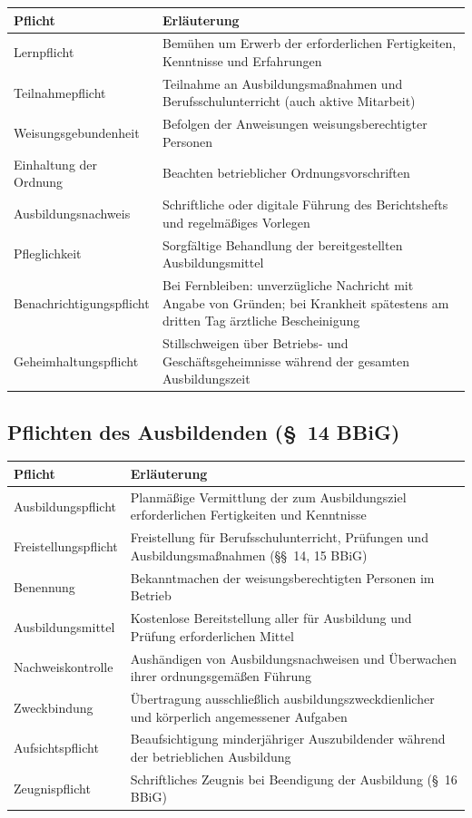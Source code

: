 \documentclass[11pt, a4paper]{article}
\begin{document}
\begin{center}
\begin{tabular}{p{4cm} p{9cm}}
\toprule
\textbf{Pflicht} & \textbf{Erläuterung}\\
\midrule
Lernpflicht & Bemühen um Erwerb der erforderlichen Fertigkeiten, Kenntnisse und Erfahrungen\\
Teilnahmepflicht & Teilnahme an Ausbildungsmaßnahmen und Berufsschulunterricht (auch aktive Mitarbeit)\\
Weisungsgebundenheit & Befolgen der Anweisungen weisungsberechtigter Personen\\
Einhaltung der Ordnung & Beachten betrieblicher Ordnungsvorschriften\\
Ausbildungsnachweis & Schriftliche oder digitale Führung des Berichtshefts und regelmäßiges Vorlegen\\
Pfleglichkeit & Sorgfältige Behandlung der bereitgestellten Ausbildungsmittel\\
Benachrichtigungspflicht & Bei Fernbleiben: unverzügliche Nachricht mit Angabe von Gründen; bei Krankheit spätestens am dritten Tag ärztliche Bescheinigung\\
Geheimhaltungspflicht & Stillschweigen über Betriebs- und Geschäftsgeheimnisse während der gesamten Ausbildungszeit\\
\bottomrule
\end{tabular}
\end{center}

\subsection{Pflichten des Ausbildenden (§~14 BBiG)}

\begin{center}
\begin{tabular}{p{4cm} p{9cm}}
\toprule
\textbf{Pflicht} & \textbf{Erläuterung}\\
\midrule
Ausbildungspflicht & Planmäßige Vermittlung der zum Ausbildungsziel erforderlichen Fertigkeiten und Kenntnisse\\
Freistellungspflicht & Freistellung für Berufsschulunterricht, Prüfungen und Ausbildungsmaßnahmen (§§~14, 15 BBiG)\\
Benennung & Bekanntmachen der weisungsberechtigten Personen im Betrieb\\
Ausbildungsmittel & Kostenlose Bereitstellung aller für Ausbildung und Prüfung erforderlichen Mittel\\
Nachweiskontrolle & Aushändigen von Ausbildungsnachweisen und Überwachen ihrer ordnungsgemäßen Führung\\
Zweckbindung & Übertragung ausschließlich ausbildungszweckdienlicher und körperlich angemessener Aufgaben\\
Aufsichtspflicht & Beaufsichtigung minderjähriger Auszubildender während der betrieblichen Ausbildung\\
Zeugnispflicht & Schriftliches Zeugnis bei Beendigung der Ausbildung (§~16 BBiG)\\
\bottomrule
\end{tabular}
\end{center}
\end{document}
